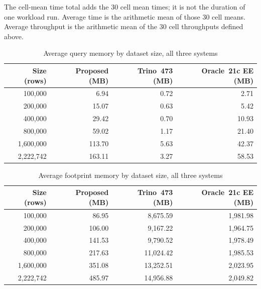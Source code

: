 The cell-mean time total adds the 30 cell mean times; it is not the
duration of one workload run.  Average time is the arithmetic mean of
those 30 cell means.  Average throughput is the arithmetic mean of the
30 cell throughputs defined above.

\begin{table}[H]
\centering
\caption{Average query memory by dataset size, all three systems}
\label{tab:avg_memory_by_size}
\begin{tabular}{rrrr}
\toprule
\textbf{Size (rows)} & \textbf{Proposed (MB)} & \textbf{Trino~473 (MB)} & \textbf{Oracle~21c EE (MB)} \\
\midrule
100{,}000 & 6.94 & 0.72 & 2.71 \\
200{,}000 & 15.07 & 0.63 & 5.42 \\
400{,}000 & 29.42 & 0.70 & 10.93 \\
800{,}000 & 59.02 & 1.17 & 21.40 \\
1{,}600{,}000 & 113.70 & 5.63 & 42.37 \\
2{,}222{,}742 & 163.11 & 3.27 & 58.53 \\
\bottomrule
\end{tabular}
\end{table}

\begin{table}[H]
\centering
\caption{Average footprint memory by dataset size, all three systems}
\label{tab:avg_footprint_by_size}
\begin{tabular}{rrrr}
\toprule
\textbf{Size (rows)} & \textbf{Proposed (MB)} & \textbf{Trino~473 (MB)} & \textbf{Oracle~21c EE (MB)} \\
\midrule
100{,}000 & 86.95 & 8{,}675.59 & 1{,}981.98 \\
200{,}000 & 106.00 & 9{,}167.22 & 1{,}964.75 \\
400{,}000 & 141.53 & 9{,}790.52 & 1{,}978.49 \\
800{,}000 & 217.63 & 11{,}024.42 & 1{,}985.53 \\
1{,}600{,}000 & 351.08 & 13{,}252.51 & 2{,}023.95 \\
2{,}222{,}742 & 485.97 & 14{,}956.88 & 2{,}049.82 \\
\bottomrule
\end{tabular}
\end{table}

